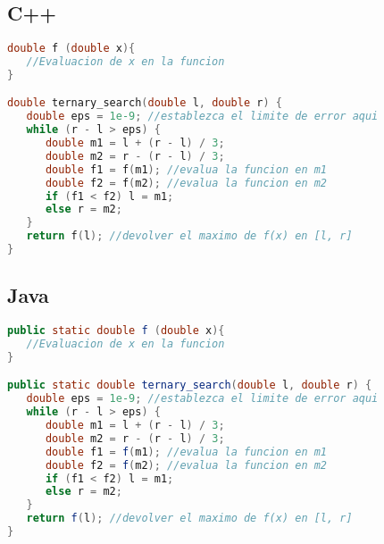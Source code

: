 \subsection{C++}
\begin{lstlisting}[language=C++]
double f (double x){
   //Evaluacion de x en la funcion
}

double ternary_search(double l, double r) {
   double eps = 1e-9; //establezca el limite de error aqui
   while (r - l > eps) {
      double m1 = l + (r - l) / 3;
      double m2 = r - (r - l) / 3;
      double f1 = f(m1); //evalua la funcion en m1
      double f2 = f(m2); //evalua la funcion en m2
      if (f1 < f2) l = m1;
      else r = m2;
   }
   return f(l); //devolver el maximo de f(x) en [l, r]
}	
\end{lstlisting}


\subsection{Java}
\begin{lstlisting}[language=Java]
public static double f (double x){
   //Evaluacion de x en la funcion
}

public static double ternary_search(double l, double r) {
   double eps = 1e-9; //establezca el limite de error aqui
   while (r - l > eps) {
      double m1 = l + (r - l) / 3;
      double m2 = r - (r - l) / 3;
      double f1 = f(m1); //evalua la funcion en m1
      double f2 = f(m2); //evalua la funcion en m2
      if (f1 < f2) l = m1;
      else r = m2;
   }
   return f(l); //devolver el maximo de f(x) en [l, r]
}
\end{lstlisting}
